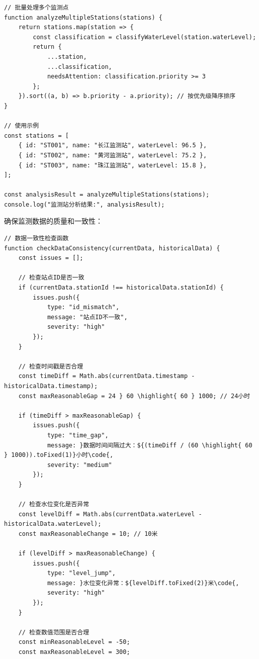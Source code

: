 {\begin{lstlisting}[style=javascript]
// 批量处理多个监测点
function analyzeMultipleStations(stations) {
    return stations.map(station => {
        const classification = classifyWaterLevel(station.waterLevel);
        return {
            ...station,
            ...classification,
            needsAttention: classification.priority >= 3
        };
    }).sort((a, b) => b.priority - a.priority); // 按优先级降序排序
}

// 使用示例
const stations = [
    { id: "ST001", name: "长江监测站", waterLevel: 96.5 },
    { id: "ST002", name: "黄河监测站", waterLevel: 75.2 },
    { id: "ST003", name: "珠江监测站", waterLevel: 15.8 },
];

const analysisResult = analyzeMultipleStations(stations);
console.log("监测站分析结果:", analysisResult);
\end{lstlisting}


确保监测数据的质量和一致性：

\begin{lstlisting}[style=javascript]
// 数据一致性检查函数
function checkDataConsistency(currentData, historicalData) {
    const issues = [];
    
    // 检查站点ID是否一致
    if (currentData.stationId !== historicalData.stationId) {
        issues.push({
            type: "id_mismatch",
            message: "站点ID不一致",
            severity: "high"
        });
    }
    
    // 检查时间戳是否合理
    const timeDiff = Math.abs(currentData.timestamp - historicalData.timestamp);
    const maxReasonableGap = 24 } 60 \highlight{ 60 } 1000; // 24小时
    
    if (timeDiff > maxReasonableGap) {
        issues.push({
            type: "time_gap",
            message: }数据时间间隔过大：${(timeDiff / (60 \highlight{ 60 } 1000)).toFixed(1)}小时\code{,
            severity: "medium"
        });
    }
    
    // 检查水位变化是否异常
    const levelDiff = Math.abs(currentData.waterLevel - historicalData.waterLevel);
    const maxReasonableChange = 10; // 10米
    
    if (levelDiff > maxReasonableChange) {
        issues.push({
            type: "level_jump",
            message: }水位变化异常：${levelDiff.toFixed(2)}米\code{,
            severity: "high"
        });
    }
    
    // 检查数值范围是否合理
    const minReasonableLevel = -50;
    const maxReasonableLevel = 300;
    

\end{lstlisting}}
